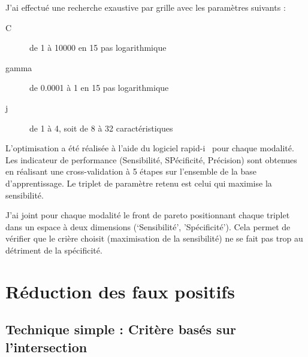 J'ai effectué une recherche exaustive par grille avec les paramètres suivants :

\begin{description}
 \item [C] de 1 à 10000 en 15 pas logarithmique
 \item [gamma] de 0.0001 à 1 en 15 pas logarithmique
 \item [j] de 1 à 4, soit de 8 à 32 caractéristiques
\end{description}

L'optimisation a été réalisée à l'aide du logiciel rapid-i~\cite{mierswa2006} pour chaque modalité. Les indicateur de performance (Sensibilité, SPécificité, Précision) sont obtenues en réalisant une cross-validation à 5 étapes sur l'ensemble de la base d'apprentissage. Le triplet de paramètre retenu est celui qui maximise la sensibilité.

J'ai joint pour chaque modalité le front de pareto positionnant chaque triplet dans un espace à deux dimensions (`Sensibilité', 'Spécificité'). Cela permet de vérifier que le crière choisit (maximisation de la sensibilité) ne se fait pas trop au détriment de la spécificité.

% 
% 

\section{Réduction des faux positifs}

\subsection{Technique simple : Critère basés sur l'intersection}

